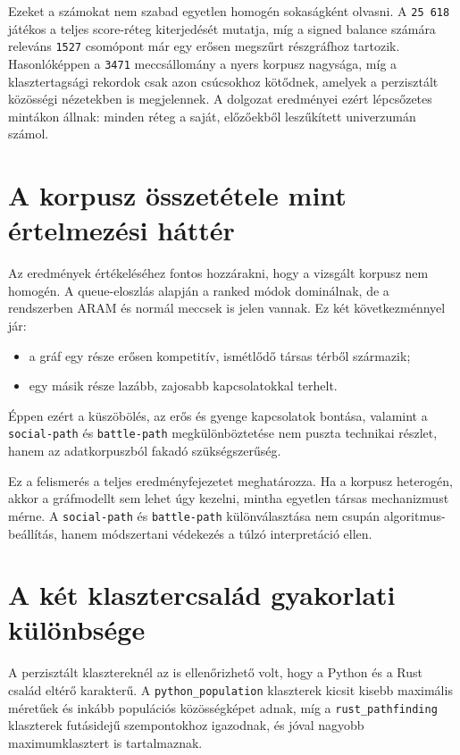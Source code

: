 \documentclass[a4paper,12pt]{report}
\begin{document}
Ezeket a számokat nem szabad egyetlen homogén sokaságként olvasni. A \texttt{25\,618} játékos a teljes score-réteg kiterjedését mutatja, míg a signed balance számára releváns \texttt{1527} csomópont már egy erősen megszűrt részgráfhoz tartozik. Hasonlóképpen a \texttt{3471} meccsállomány a nyers korpusz nagysága, míg a klasztertagsági rekordok csak azon csúcsokhoz kötődnek, amelyek a perzisztált közösségi nézetekben is megjelennek. A dolgozat eredményei ezért lépcsőzetes mintákon állnak: minden réteg a saját, előzőekből leszűkített univerzumán számol.

\section{A korpusz összetétele mint értelmezési háttér}

Az eredmények értékeléséhez fontos hozzárakni, hogy a vizsgált korpusz nem homogén. A queue-eloszlás alapján a ranked módok dominálnak, de a rendszerben ARAM és normál meccsek is jelen vannak. Ez két következménnyel jár:

\begin{itemize}
    \item a gráf egy része erősen kompetitív, ismétlődő társas térből származik;
    \item egy másik része lazább, zajosabb kapcsolatokkal terhelt.
\end{itemize}

Éppen ezért a küszöbölés, az erős és gyenge kapcsolatok bontása, valamint a \texttt{social-path} és \texttt{battle-path} megkülönböztetése nem puszta technikai részlet, hanem az adatkorpuszból fakadó szükségszerűség.

Ez a felismerés a teljes eredményfejezetet meghatározza. Ha a korpusz heterogén, akkor a gráfmodellt sem lehet úgy kezelni, mintha egyetlen társas mechanizmust mérne. A \texttt{social-path} és \texttt{battle-path} különválasztása nem csupán algoritmus-beállítás, hanem módszertani védekezés a túlzó interpretáció ellen.

\section{A két klasztercsalád gyakorlati különbsége}

A perzisztált klasztereknél az is ellenőrizhető volt, hogy a Python és a Rust család eltérő karakterű. A \texttt{python\_population} klaszterek kicsit kisebb maximális méretűek és inkább populációs közösségképet adnak, míg a \texttt{rust\_pathfinding} klaszterek futásidejű szempontokhoz igazodnak, és jóval nagyobb maximumklasztert is tartalmaznak.
\end{document}
